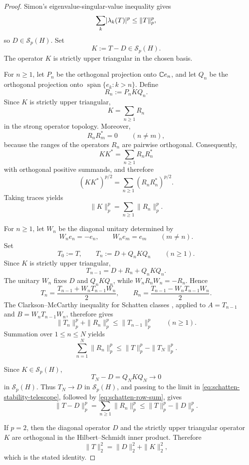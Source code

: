 \begin{proof}
  Simon's eigenvalue-singular-value inequality
  \cite[Theorem~1.15]{Simon2005TraceIdeals} gives
  \[
    \sum_k\lvert \lambda_k(T) \rvert^p\le \|T\|_p^p,
  \]
  so \(D\in \mathcal S_p(H)\). Set
  \[
    K:=T-D\in \mathcal S_p(H).
  \]
  The operator \(K\) is strictly upper triangular in the chosen basis.

  For \(n\ge 1\), let \(P_n\) be the orthogonal projection onto
  \(\mathbb{C} e_n\), and let \(Q_n\) be the orthogonal projection onto
  \(\overline{\operatorname{span}}\{e_k:k>n\}\). Define
  \[
    R_n:=P_nKQ_n.
  \]
  Since \(K\) is strictly upper triangular,
  \[
    K=\sum_{n\ge 1}R_n
  \]
  in the strong operator topology. Moreover,
  \[
    R_nR_m^*=0
    \qquad (n\ne m),
  \]
  because the ranges of the operators \(R_n\) are pairwise orthogonal.
  Consequently,
  \[
    KK^*=\sum_{n\ge 1}R_nR_n^*
  \]
  with orthogonal positive summands, and therefore
  \[
    (KK^*)^{p/2}=\sum_{n\ge 1}(R_nR_n^*)^{p/2}.
  \]
  Taking traces yields
  \begin{equation}\label{eq:schatten-row-sum}
    \|K\|_p^p
    =\sum_{n\ge 1}\|R_n\|_p^p.
  \end{equation}

  For \(n\ge 1\), let \(W_n\) be the diagonal unitary determined by
  \[
    W_ne_n=-e_n,
    \qquad
    W_ne_m=e_m
    \qquad (m\ne n).
  \]
  Set
  \[
    T_0:=T,
    \qquad
    T_n:=D+Q_nKQ_n
    \qquad (n\ge 1).
  \]
  Since \(K\) is strictly upper triangular,
  \[
    T_{n-1}=D+R_n+Q_nKQ_n.
  \]
  The unitary \(W_n\) fixes \(D\) and \(Q_nKQ_n\), while
  \(W_nR_nW_n=-R_n\). Hence
  \[
    T_n=\frac{T_{n-1}+W_nT_{n-1}W_n}{2},
    \qquad
    R_n=\frac{T_{n-1}-W_nT_{n-1}W_n}{2}.
  \]
  The Clarkson--McCarthy inequality for Schatten classes
  \cite{BallCarlenLieb1994}, applied to
  \(A=T_{n-1}\) and \(B=W_nT_{n-1}W_n\), therefore gives
  \[
    \|T_n\|_p^p+\|R_n\|_p^p\le \|T_{n-1}\|_p^p
    \qquad (n\ge 1).
  \]
  Summation over \(1\le n\le N\) yields
  \begin{equation}\label{eq:schatten-stability-telescope}
    \sum_{n=1}^N\|R_n\|_p^p
    \le \|T\|_p^p-\|T_N\|_p^p.
  \end{equation}

  Since \(K\in \mathcal S_p(H)\),
  \[
    T_N-D=Q_NKQ_N\longrightarrow 0
  \]
  in \(\mathcal S_p(H)\). Thus \(T_N\to D\) in \(\mathcal S_p(H)\), and
  passing to the limit in \eqref{eq:schatten-stability-telescope},
  followed by \eqref{eq:schatten-row-sum}, gives
  \[
    \|T-D\|_p^p
    =\sum_{n\ge 1}\|R_n\|_p^p
    \le \|T\|_p^p-\|D\|_p^p.
  \]

  If \(p=2\), then the diagonal operator \(D\) and the strictly upper
  triangular operator \(K\) are orthogonal in the Hilbert--Schmidt inner
  product. Therefore
  \[
    \|T\|_2^2=\|D\|_2^2+\|K\|_2^2,
  \]
  which is the stated identity.
\end{proof}

